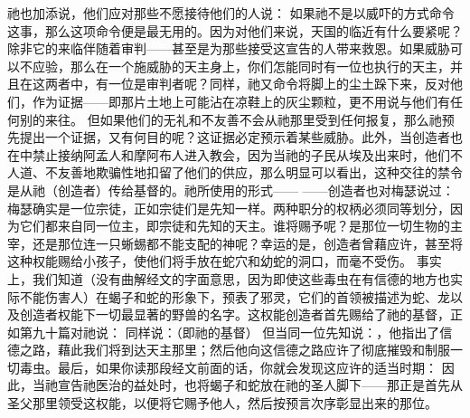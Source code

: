 祂也加添说，他们应对那些不愿接待他们的人说： 如果祂不是以威吓的方式命令这事，那么这项命令便是最无用的。因为对他们来说，天国的临近有什么要紧呢？除非它的来临伴随着审判——甚至是为那些接受这宣告的人带来救恩。如果威胁可以不应验，那么在一个施威胁的天主身上，你们怎能同时有一位也执行的天主，并且在这两者中，有一位是审判者呢？同样，祂又命令将脚上的尘土跺下来，反对他们，作为证据——即那片土地上可能沾在凉鞋上的灰尘颗粒，更不用说与他们有任何别的来往。 但如果他们的无礼和不友善不会从祂那里受到任何报复，那么祂预先提出一个证据，又有何目的呢？这证据必定预示着某些威胁。此外，当创造者也在中禁止接纳阿孟人和摩阿布人进入教会，因为当祂的子民从埃及出来时，他们不人道、不友善地欺骗性地扣留了他们的供应，那么明显可以看出，这种交往的禁令是从祂（创造者）传给基督的。祂所使用的形式—— ——创造者也对梅瑟说过： 梅瑟确实是一位宗徒，正如宗徒们是先知一样。两种职分的权柄必须同等划分，因为它们都来自同一位主，即宗徒和先知的天主。谁将赐予呢？是那位一切生物的主宰，还是那位连一只蜥蜴都不能支配的神呢？幸运的是，创造者曾藉应许，甚至将这种权能赐给小孩子，使他们将手放在蛇穴和幼蛇的洞口，而毫不受伤。 事实上，我们知道（没有曲解经文的字面意思，因为即使这些毒虫在有信德的地方也实际不能伤害人）在蝎子和蛇的形象下，预表了邪灵，它们的首领被描述为蛇、龙以及创造者权能下一切最显著的野兽的名字。这权能创造者首先赐给了祂的基督，正如第九十篇对祂说： 同样说：（即祂的基督） 但当同一位先知说：，他指出了信德之路，藉此我们将到达天主那里；然后他向这信德之路应许了彻底摧毁和制服一切毒虫。最后，如果你读那段经文前面的话，你就会发现这应许的适当时期： 因此，当祂宣告祂医治的益处时，也将蝎子和蛇放在祂的圣人脚下——那正是首先从圣父那里领受这权能，以便将它赐予他人，然后按预言次序彰显出来的那位。\par


